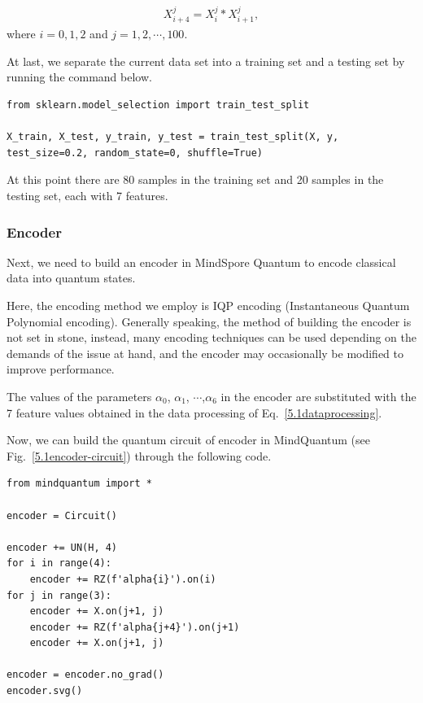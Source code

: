 \begin{eqnarray}\label{5.1dataprocessing}
    X_{i+4}^{j} = X_{i}^{j} * X_{i+1}^{j},
\end{eqnarray}
where $i = 0, 1, 2$ and $j = 1, 2, \cdots, 100$.

At last, we separate the current data set into a training set and a testing set by running the command below.

\begin{lstlisting}
from sklearn.model_selection import train_test_split                                                   

X_train, X_test, y_train, y_test = train_test_split(X, y, test_size=0.2, random_state=0, shuffle=True)  
\end{lstlisting}

At this point there are 80 samples in the training set and 20 samples in the testing set, each with 7 features.

\subsubsection{Encoder}
Next, we need to build an encoder in MindSpore Quantum to encode classical data into quantum states.

Here, the encoding method we employ is IQP encoding (Instantaneous Quantum Polynomial encoding). Generally speaking, the method of building the encoder is not set in stone, instead, many encoding techniques can be used depending on the demands of the issue at hand, and the encoder may occasionally be modified to improve performance.

The values of the parameters $\alpha_0$, $\alpha_1$, $\cdots$,$\alpha_6$ in the encoder are substituted with the 7 feature values obtained in the data processing of Eq.~\eqref{5.1dataprocessing}.

Now, we can build the quantum circuit of encoder in MindQuantum (see Fig.~\ref{5.1encoder-circuit}) through the following code.

\begin{lstlisting}
from mindquantum import *   
        
encoder = Circuit()  

encoder += UN(H, 4)                                  
for i in range(4):                                   
    encoder += RZ(f'alpha{i}').on(i)                
for j in range(3):                                   
    encoder += X.on(j+1, j)                         
    encoder += RZ(f'alpha{j+4}').on(j+1)             
    encoder += X.on(j+1, j)                         

encoder = encoder.no_grad()                          
encoder.svg()
\end{lstlisting}

